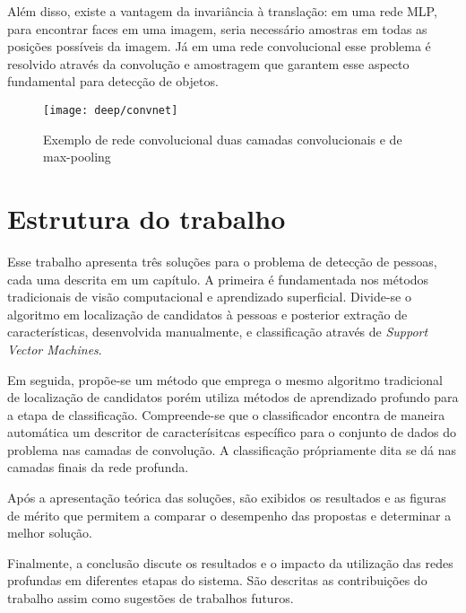 Além disso, existe a vantagem da invariância à translação: em uma rede MLP, para encontrar faces em uma imagem, seria necessário amostras em todas as posições possíveis da imagem. Já em uma rede convolucional esse problema é resolvido através da convolução e amostragem que garantem esse aspecto fundamental para detecção de objetos.

\begin{figure}[h]
\centering
\texttt{[image: deep/convnet]}
\caption{Exemplo de rede convolucional duas camadas convolucionais e de max-pooling}
\label{fig:convnet}
\end{figure}

\section{Estrutura do trabalho}
Esse trabalho apresenta três soluções para o problema de detecção de pessoas, cada uma descrita em um capítulo. A primeira é fundamentada nos métodos tradicionais de visão computacional e aprendizado superficial. Divide-se o algoritmo em localização de candidatos à pessoas e posterior extração de características, desenvolvida manualmente, e classificação através de \textit{Support Vector Machines}.

Em seguida, propõe-se um método que emprega o mesmo algoritmo tradicional de localização de candidatos porém utiliza métodos de aprendizado profundo para a etapa de classificação. Compreende-se que o classificador encontra de maneira automática um descritor de caracterísitcas específico para o conjunto de dados do problema nas camadas de convolução. A classificação própriamente dita se dá nas camadas finais da rede profunda.

Após a apresentação teórica das soluções, são exibidos os resultados e as figuras de mérito que permitem a comparar o desempenho das propostas e determinar a melhor solução.

Finalmente, a conclusão discute os resultados e o impacto da utilização das redes profundas em diferentes etapas do sistema. São descritas as contribuições do trabalho assim como sugestões de trabalhos futuros.




